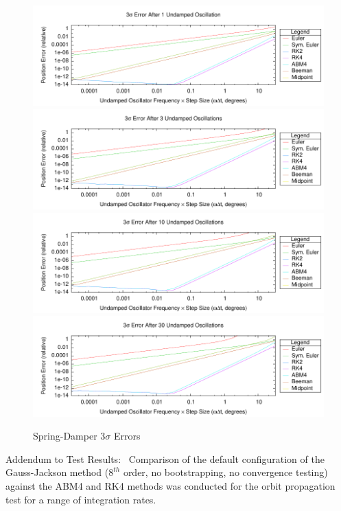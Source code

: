 \begin{description}
\begin{figure}[hbtp]
\centering
\includegraphics{figures/plot_TranslationTestSpringDamper_revs_1_monte_err}
\vspace{2.0ex}
\includegraphics{figures/plot_TranslationTestSpringDamper_revs_3_monte_err}
\vspace{2.0ex}
\includegraphics{figures/plot_TranslationTestSpringDamper_revs_10_monte_err}
\vspace{2.0ex}
\includegraphics{figures/plot_TranslationTestSpringDamper_revs_30_monte_err}
\caption{Spring-Damper 3$\sigma$ Errors}
\label{fig:spring_damper_err}
\end{figure}


\item{Addendum to Test Results:}\ \newline
Comparison of the default configuration of the Gauss-Jackson method ($8^{th}$ 
order, no bootstrapping, no convergence testing) against the ABM4 and RK4 
methods was conducted for the orbit propagation test for a range of 
integration rates.


\end{description}
